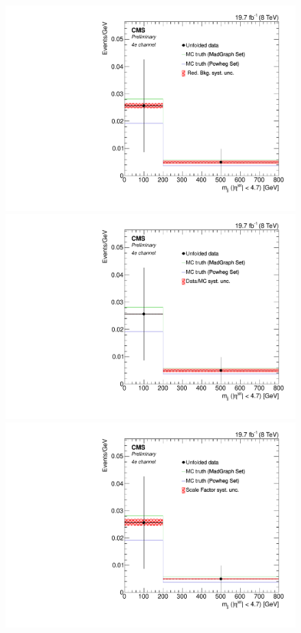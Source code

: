 \begin{figure}[hbtp]
\begin{center}
    \includegraphics[width=0.8\cmsFigWidth]{Figures/Unfolding/Systematics/ZZTo4e_Mjj_RedBkg_Mad_fr}     
    \includegraphics[width=0.8\cmsFigWidth]{Figures/Unfolding/Systematics/ZZTo4e_Mjj_UnfDataOverGenMC_Mad_fr}     
    \includegraphics[width=0.8\cmsFigWidth]{Figures/Unfolding/Systematics/ZZTo4e_Mjj_SFSq_Mad_fr}

\end{center}
\end{figure}
